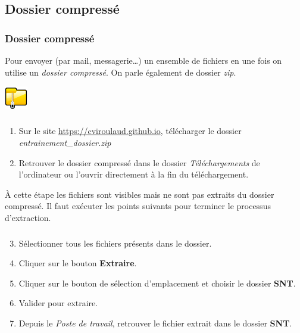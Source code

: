 \documentclass[svgnames,11pt]{beamer}
\begin{document}
\subsection{Dossier compressé}
\begin{frame}
    \frametitle{Dossier compressé}

    Pour envoyer  (par mail, messagerie\dots) un ensemble de fichiers en une fois on utilise un \emph{dossier compressé}. On parle également de dossier \emph{zip}.
    \begin{center}
    \centering
    \includegraphics[width=1cm]{ressources/zip.png}
    \label{IMG}
    \end{center}

\end{frame}
\begin{frame}
    \frametitle{}

    \begin{activite}
    \begin{enumerate}
        \item Sur le site \url{https://cviroulaud.github.io}, télécharger le dossier \emph{entrainement\_dossier.zip}
        \item Retrouver le dossier compressé dans le dossier \emph{Téléchargements} de l'ordinateur ou l'ouvrir directement à la fin du téléchargement.
        
        
    \end{enumerate}
    \end{activite}
    \begin{aretenir}[]
        À cette étape les fichiers sont visibles mais ne sont pas extraits du dossier compressé. Il faut exécuter les points suivants pour terminer le processus d'extraction.
        \end{aretenir}
\end{frame}
\begin{frame}
    \frametitle{}
\setcounter{compteuractivite}{8}
    \begin{activite}
    \begin{enumerate}
        \setcounter{enumi}{2}
        \item Sélectionner tous les fichiers présents dans le dossier.
        \item Cliquer sur le bouton \textbf{Extraire}.
        \item Cliquer sur le bouton de sélection d'emplacement et choisir le dossier \textbf{SNT}.
        \item Valider pour extraire.
        \item Depuis le \emph{Poste de travail}, retrouver le fichier extrait dans le dossier \textbf{SNT}.
    \end{enumerate}
    \end{activite}

\end{frame}
\end{document}
